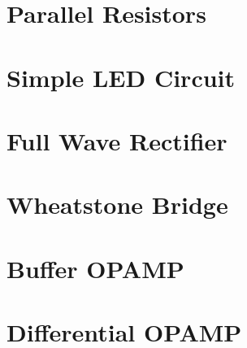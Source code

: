 \documentclass{article}
\begin{document}
\section{Parallel Resistors}
\begin{figure}[H]
    \centering
    
\end{figure}

\section{Simple LED Circuit}
\begin{figure}[H]
    \centering
    
\end{figure}

\section{Full Wave Rectifier}
\begin{figure}[H]
    \centering
    
\end{figure}

\section{Wheatstone Bridge}
\begin{figure}[H]
    \centering
    
\end{figure}

\section{Buffer OPAMP}
\begin{figure}[H]
    \centering
    
\end{figure}

\section{Differential OPAMP}
\begin{figure}[H]
    \centering
    
\end{figure}
\end{document}
